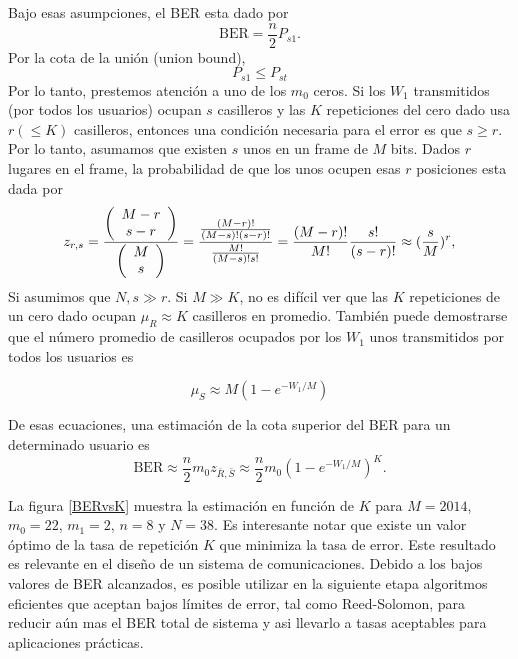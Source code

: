 Bajo esas asumpciones, el BER esta dado por
\begin{equation}
\text{BER} = \frac{n}{2}P_{s1}.
\label{eq:ber_01}
\end{equation}
Por la cota de la unión (union bound), 
\begin{equation}
P_{s1}\leq P_{st}
\label{eq:union_bound}
\end{equation}
Por lo tanto, prestemos atención a uno de los $m_0$ ceros. Si los $W_{1}$ transmitidos (por todos los usuarios) ocupan $s$ casilleros y las $K$ repeticiones del cero dado usa $r ( \leq K)$ casilleros, entonces una condición necesaria para el error es que $s \geq r$. Por lo tanto, asumamos que existen $s$ unos en un frame de $M$ bits. Dados $r$ lugares en el frame, la probabilidad de que los unos ocupen esas $r$ posiciones esta dada por 
\begin{equation}
z_{r,s} = \frac{\left(\begin{array}{c} M-r \\ s-r\end{array}\right)}{\left(\begin{array}{c} M \\ s\end{array}\right)}= \frac{\frac{(M-r)!}{(M-s)! (s-r)!}}{\frac{M!}{(M-s)!s!}} = \frac{(M-r)!}{M!}\frac{s!}{(s-r)!}\approx (\frac{s}{M})^r,
\end{equation}
Si asumimos que $N,s\gg r$. Si $M \gg K$, no es difícil ver que las $K$ repeticiones de un cero dado ocupan $\mu_{R} \approx K$ casilleros en promedio. También puede demostrarse que el número promedio de casilleros ocupados por los $W_{1}$ unos transmitidos por todos los usuarios es

\begin{equation}
\mu_{S} \approx M (1-e^{-W_1/M})
\end{equation}
 
De esas ecuaciones, una estimación de la cota superior del BER para un determinado usuario es
\begin{equation}
\text{BER} \approx \frac{n}{2} m_0 z_{\bar{R},\bar{S}} \approx \frac{n}{2} m_0 \left(1-e^{-W_1/M}\right)^K.
\end{equation}

La figura \ref{BERvsK} muestra la estimación en función de $K$ para $M=2014$, $m_{0} = 22$, $m_{1} = 2$, $n = 8$ y $N=38$. Es interesante notar que existe un valor óptimo de la tasa de repetición $K$ que minimiza la tasa de error. Este resultado es relevante en el diseño de un sistema de comunicaciones. Debido a los bajos valores de BER alcanzados, es posible utilizar en la siguiente etapa algoritmos eficientes que aceptan bajos límites de error, tal como Reed-Solomon, para reducir aún mas el BER total de sistema y asi llevarlo a tasas aceptables para aplicaciones prácticas.

